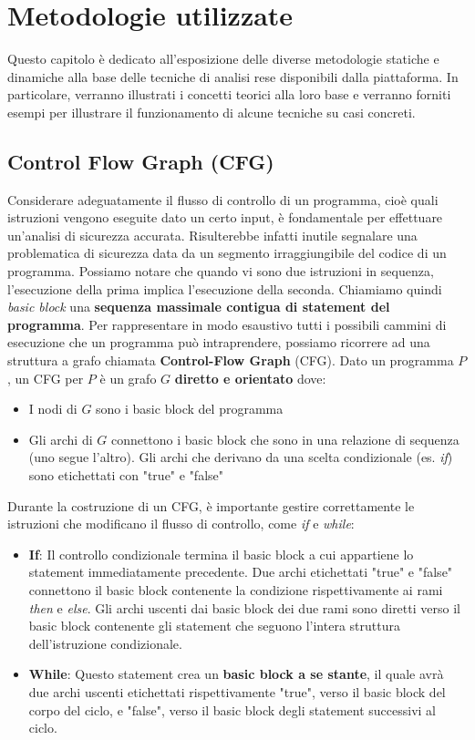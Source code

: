 \documentclass[../main.tex]{subfiles}
\begin{document}
\chapter{Metodologie utilizzate}
\label{chap:oth}
Questo capitolo è dedicato all'esposizione delle diverse metodologie statiche e dinamiche alla base delle tecniche di analisi rese disponibili dalla piattaforma.
In particolare, verranno illustrati i concetti teorici alla loro base e verranno forniti esempi per illustrare il funzionamento di alcune tecniche su casi concreti.
\section{Control Flow Graph (CFG)}
Considerare adeguatamente il flusso di controllo di un programma, cioè quali istruzioni vengono eseguite dato un certo input, è fondamentale per effettuare un'analisi di sicurezza accurata. Risulterebbe infatti inutile segnalare
una problematica di sicurezza data da un segmento irraggiungibile del codice di un programma.
Possiamo notare che quando vi sono due istruzioni in sequenza, l'esecuzione della prima implica l'esecuzione della seconda. 
Chiamiamo quindi \textit{basic block} una \textbf{sequenza massimale contigua di statement del programma}.
Per rappresentare in modo esaustivo tutti i possibili cammini di esecuzione che un programma può intraprendere, possiamo ricorrere ad una struttura a grafo chiamata \textbf{Control-Flow Graph} (CFG).
Dato un programma $P$, un CFG per $P$ è un grafo $G$ \textbf{diretto e orientato} dove:
\begin{itemize}
    \item I nodi di $G$ sono i basic block del programma
    \item Gli archi di $G$ connettono i basic block che sono in una relazione di sequenza (uno segue l'altro). Gli archi che derivano da una scelta condizionale (es. \textit{if}) sono etichettati con "true" e "false"
\end{itemize}
Durante la costruzione di un CFG, è importante gestire correttamente le istruzioni che modificano il flusso di controllo, come \textit{if} e \textit{while}:
\begin{itemize}
    \item \textbf{If}: Il controllo condizionale termina il basic block a cui appartiene lo statement immediatamente precedente. Due archi etichettati "true" e "false" connettono il basic block contenente la condizione rispettivamente ai rami \textit{then} e \textit{else}.
    Gli archi uscenti dai basic block dei due rami sono diretti verso il basic block contenente gli statement che seguono l'intera struttura dell'istruzione condizionale.
    \item \textbf{While}: Questo statement crea un \textbf{basic block a se stante}, il quale avrà due archi uscenti etichettati rispettivamente "true", verso il basic block del corpo del ciclo, e "false", verso il basic block degli statement successivi al ciclo.
\end{itemize}
\end{document}
